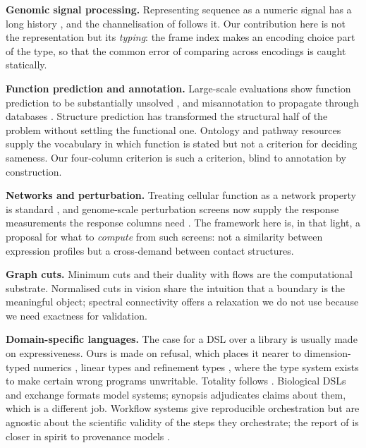 \documentclass[11pt,twocolumn,a4paper]{article}
\theoremstyle{plain}
\theoremstyle{definition}
\theoremstyle{remark}
\begin{document}
\textbf{Genomic signal processing.} Representing sequence as a numeric
signal has a long history \cite{voss1992evolution,anastassiou2001genomic},
and the channelisation of  follows it. Our
contribution here is not the representation but its \emph{typing}: the
frame index makes an encoding choice part of the type, so that the
common error of comparing across encodings is caught statically.

\textbf{Function prediction and annotation.} Large-scale evaluations
show function prediction to be substantially unsolved
\cite{radivojac2013large}, and misannotation to propagate through
databases \cite{schnoes2009annotation}. Structure prediction
\cite{jumper2021highly} has transformed the structural half of the
problem without settling the functional one. Ontology and pathway
resources \cite{ashburner2000gene,kanehisa2000kegg} supply the
vocabulary in which function is stated but not a criterion for deciding
sameness. Our four-column criterion is such a criterion, blind to
annotation by construction.

\textbf{Networks and perturbation.} Treating cellular function as a
network property is standard \cite{barabasi2004network}, and
genome-scale perturbation screens now supply the response measurements
the response columns need
\cite{costanzo2016global,dixit2016perturb,replogle2022mapping}. The
framework here is, in that light, a proposal for what to \emph{compute}
from such screens: not a similarity between expression profiles but a
cross-demand between contact structures.

\textbf{Graph cuts.} Minimum cuts and their duality with flows
\cite{ford1956maximal,gomory1961multi,stoer1997simple,karger1996new,schrijver2003combinatorial}
are the computational substrate. Normalised cuts in vision
\cite{shi2000normalized,boykov2004experimental} share the intuition that
a boundary is the meaningful object; spectral connectivity
\cite{fiedler1973algebraic} offers a relaxation we do not use because we
need exactness for validation.

\textbf{Domain-specific languages.} The case for a DSL over a library
\cite{hudak1996building,mernik2005when,fowler2010domain} is usually made
on expressiveness. Ours is made on refusal, which places it nearer to
dimension-typed numerics \cite{kennedy1997relational}, linear types
\cite{wadler1990linear} and refinement types
\cite{freeman1991refinement}, where the type system exists to make
certain wrong programs unwritable. Totality follows
\cite{turner1995total}. Biological DSLs
\cite{pedersen2009towards,lakin2011design} and exchange formats
\cite{hucka2003systems} model systems; synopsis adjudicates claims about
them, which is a different job. Workflow systems
\cite{koster2012snakemake,difrancesco2015nextflow} give reproducible
orchestration but are agnostic about the scientific validity of the
steps they orchestrate; the report of  is closer in
spirit to provenance models \cite{moreau2011provenance,wilkinson2016fair}.
\end{document}
